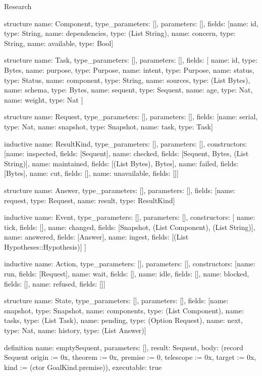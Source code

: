 \begin{lexlean}{Research}
\begin{semanticmodule}
structure{
  name: Component,
  type_parameters: [],
  parameters: [],
  fields: [{name: id, type: String}, {name: dependencies, type: (List String)}, {name: concern, type: String}, {name: available, type: Bool}]
}

structure{
  name: Task,
  type_parameters: [],
  parameters: [],
  fields: [
    {name: id, type: Bytes},
    {name: purpose, type: Purpose},
    {name: intent, type: Purpose},
    {name: status, type: Status},
    {name: component, type: String},
    {name: sources, type: (List Bytes)},
    {name: schema, type: Bytes},
    {name: sequent, type: Sequent},
    {name: age, type: Nat},
    {name: weight, type: Nat}
  ]
}

structure{
  name: Request,
  type_parameters: [],
  parameters: [],
  fields: [{name: serial, type: Nat}, {name: snapshot, type: Snapshot}, {name: task, type: Task}]
}

inductive{
  name: ResultKind,
  type_parameters: [],
  parameters: [],
  constructors: [{name: inspected, fields: [Sequent]}, {name: checked, fields: [Sequent, Bytes, (List String)]}, {name: maintained, fields: [(List Bytes), Bytes]}, {name: failed, fields: [Bytes]}, {name: cut, fields: []}, {name: unavailable, fields: []}]
}

structure{
  name: Answer,
  type_parameters: [],
  parameters: [],
  fields: [{name: request, type: Request}, {name: result, type: ResultKind}]
}

inductive{
  name: Event,
  type_parameters: [],
  parameters: [],
  constructors: [
    {name: tick, fields: []},
    {name: changed, fields: [Snapshot, (List Component), (List String)]},
    {name: answered, fields: [Answer]},
    {name: ingest, fields: [(List Hypotheses::Hypothesis)]}
  ]
}

inductive{
  name: Action,
  type_parameters: [],
  parameters: [],
  constructors: [{name: run, fields: [Request]}, {name: wait, fields: []}, {name: idle, fields: []}, {name: blocked, fields: []}, {name: refused, fields: []}]
}

structure{
  name: State,
  type_parameters: [],
  parameters: [],
  fields: [{name: snapshot, type: Snapshot}, {name: components, type: (List Component)}, {name: tasks, type: (List Task)}, {name: pending, type: (Option Request)}, {name: next, type: Nat}, {name: history, type: (List Answer)}]
}

definition{
  name: emptySequent,
  parameters: [],
  result: Sequent,
  body: (record Sequent {origin := 0x, theorem := 0x, premise := 0, telescope := 0x, target := 0x, kind := (ctor GoalKind.premise)}),
  executable: true
}


\end{semanticmodule}
\end{lexlean}
